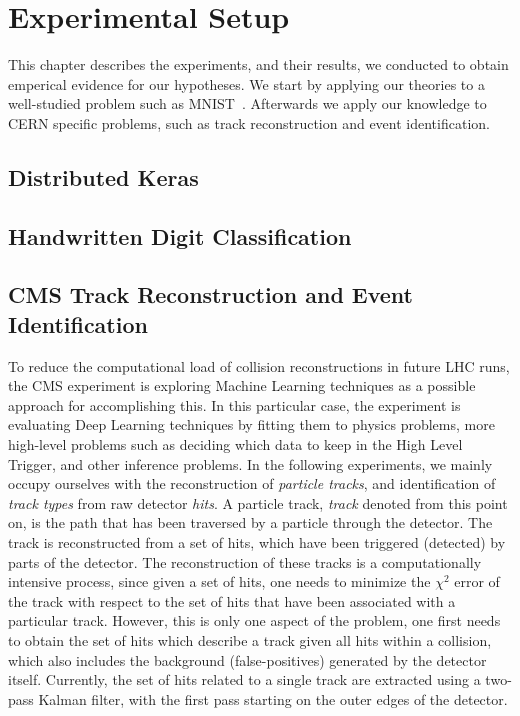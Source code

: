 %
%
%

\chapter{Experimental Setup}
\label{chapter:experiments}

This chapter describes the experiments, and their results, we conducted to obtain emperical evidence for our hypotheses. We start by applying our theories to a well-studied problem such as MNIST~\cite{mnist}. Afterwards we apply our knowledge to CERN specific problems, such as track reconstruction and event identification.

\section{Distributed Keras}
\label{sec:distributed_keras}

\section{Handwritten Digit Classification}
\label{sec:experiment_mnist}

\section{CMS Track Reconstruction and Event Identification}
\label{sec:experiment_track_reconstruction}

To reduce the computational load of collision reconstructions in future LHC runs, the CMS experiment is exploring Machine Learning techniques as a possible approach for accomplishing this. In this particular case, the experiment is evaluating Deep Learning techniques by fitting them to physics problems, more high-level problems such as deciding which data to keep in the High Level Trigger, and other inference problems. In the following experiments, we mainly occupy ourselves with the reconstruction of \emph{particle tracks}, and identification of \emph{track types} from raw detector \emph{hits}. A particle track, \emph{track} denoted from this point on, is the path that has been traversed by a particle through the detector. The track is reconstructed from a set of hits, which have been triggered (detected) by parts of the detector. The reconstruction of these tracks is a computationally intensive process, since given a set of hits, one needs to minimize the $\chi^2$ error of the track with respect to the set of hits that have been associated with a particular track. However, this is only one aspect of the problem, one first needs to obtain the set of hits which describe a track given all hits within a collision, which also includes the background (false-positives) generated by the detector itself. Currently, the set of hits related to a single track are extracted using a two-pass Kalman filter, with the first pass starting on the outer edges of the detector.\\

